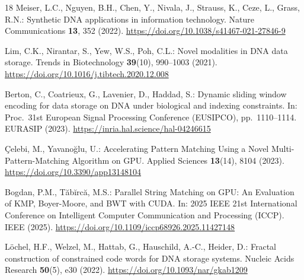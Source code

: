 \documentclass[runningheads]{llncs}
\begin{document}
\begin{thebibliography}{18}
Meiser, L.C., Nguyen, B.H., Chen, Y., Nivala, J., Strauss, K., Ceze,
L., Grass, R.N.: Synthetic DNA applications in information
technology. Nature Communications \textbf{13}, 352 (2022).
\url{https://doi.org/10.1038/s41467-021-27846-9}

Lim, C.K., Nirantar, S., Yew, W.S., Poh, C.L.: Novel modalities in
DNA data storage. Trends in Biotechnology \textbf{39}(10), 990--1003
(2021).
\url{https://doi.org/10.1016/j.tibtech.2020.12.008}

Berton, C., Coatrieux, G., Lavenier, D., Haddad, S.: Dynamic sliding
window encoding for data storage on DNA under biological and indexing
constraints. In: Proc.\ 31st European Signal Processing Conference
(EUSIPCO), pp.~1110--1114. EURASIP (2023).
\url{https://inria.hal.science/hal-04246615}

\c{C}elebi, M., Yavano\u{g}lu, U.: Accelerating Pattern Matching Using a Novel
Multi-Pattern-Matching Algorithm on GPU. Applied Sciences \textbf{13}(14),
8104 (2023).
\url{https://doi.org/10.3390/app13148104}

Bogdan, P.M., T\u{a}b\u{i}rc\u{a}, M.S.: Parallel String Matching on GPU: An
Evaluation of KMP, Boyer-Moore, and BWT with CUDA. In: 2025 IEEE 21st
International Conference on Intelligent Computer Communication and
Processing (ICCP). IEEE (2025).
\url{https://doi.org/10.1109/iccp68926.2025.11427148}

L\"ochel, H.F., Welzel, M., Hattab, G., Hauschild, A.-C., Heider, D.:
Fractal construction of constrained code words for DNA storage systems.
Nucleic Acids Research \textbf{50}(5), e30 (2022).
\url{https://doi.org/10.1093/nar/gkab1209}


\end{thebibliography}
\end{document}

